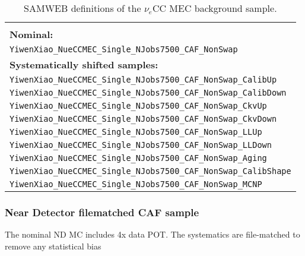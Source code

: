 

\begin{table}[!ht]
\centering
\caption{SAMWEB definitions of the $\nu_e$CC MEC background sample.}
\begin{tabular}{p{\textwidth}}
\hline\hline\\[-2mm]
\textbf{Nominal:}\\
\texttt{YiwenXiao\_NueCCMEC\_Single\_NJobs7500\_CAF\_NonSwap}\\[2mm]
\textbf{Systematically shifted samples:}\\
\texttt{YiwenXiao\_NueCCMEC\_Single\_NJobs7500\_CAF\_NonSwap\_CalibUp}\\[2mm]
\texttt{YiwenXiao\_NueCCMEC\_Single\_NJobs7500\_CAF\_NonSwap\_CalibDown}\\[2mm]
\texttt{YiwenXiao\_NueCCMEC\_Single\_NJobs7500\_CAF\_NonSwap\_CkvUp}\\[2mm]
\texttt{YiwenXiao\_NueCCMEC\_Single\_NJobs7500\_CAF\_NonSwap\_CkvDown}\\[2mm]
\texttt{YiwenXiao\_NueCCMEC\_Single\_NJobs7500\_CAF\_NonSwap\_LLUp}\\[2mm]
\texttt{YiwenXiao\_NueCCMEC\_Single\_NJobs7500\_CAF\_NonSwap\_LLDown}\\[2mm]
\texttt{YiwenXiao\_NueCCMEC\_Single\_NJobs7500\_CAF\_NonSwap\_Aging}\\[2mm]
\texttt{YiwenXiao\_NueCCMEC\_Single\_NJobs7500\_CAF\_NonSwap\_CalibShape}\\[2mm]
\texttt{YiwenXiao\_NueCCMEC\_Single\_NJobs7500\_CAF\_NonSwap\_MCNP}\\[2mm]
\hline\hline
\end{tabular}
\label{tab:NueCCMECDefinitions}
\end{table}

\subsubsection*{Near Detector filematched CAF sample}

The nominal ND MC includes 4x data POT. The systematics are file-matched to remove any statistical bias

